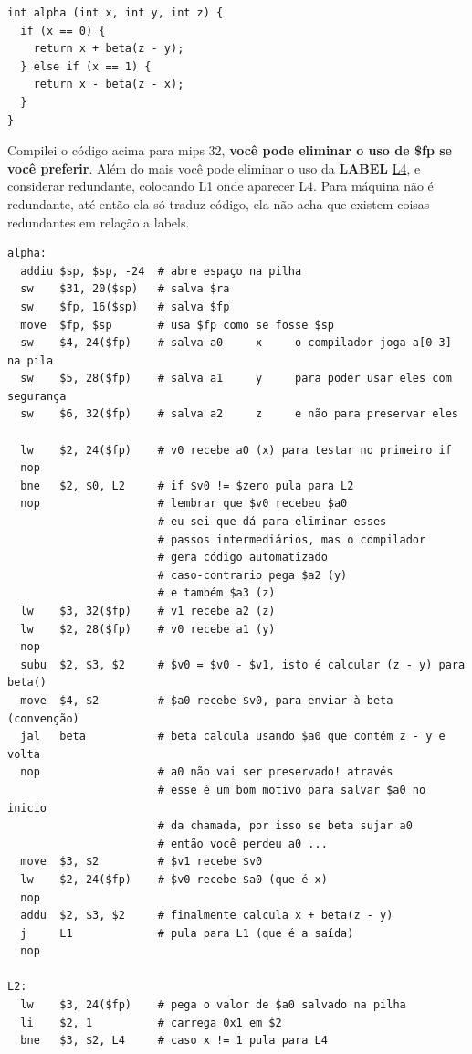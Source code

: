 \documentclass{article}
\begin{document}
\clearpage

\begin{verbatim}
int alpha (int x, int y, int z) {
  if (x == 0) {
    return x + beta(z - y);
  } else if (x == 1) {
    return x - beta(z - x);
  }
}
\end{verbatim}

Compilei o código acima para mips 32, {\bfseries você pode eliminar o uso de
\$fp se você preferir}. Além do mais você pode eliminar o uso da \textbf{LABEL}
\underline{L4}, e considerar redundante, colocando L1 onde aparecer L4. Para
máquina não é redundante, até então ela só traduz código, ela não acha que
existem coisas redundantes em relação a labels.

\begin{verbatim}
alpha:
  addiu $sp, $sp, -24  # abre espaço na pilha
  sw    $31, 20($sp)   # salva $ra
  sw    $fp, 16($sp)   # salva $fp
  move  $fp, $sp       # usa $fp como se fosse $sp
  sw    $4, 24($fp)    # salva a0     x     o compilador joga a[0-3] na pila
  sw    $5, 28($fp)    # salva a1     y     para poder usar eles com segurança
  sw    $6, 32($fp)    # salva a2     z     e não para preservar eles

  lw    $2, 24($fp)    # v0 recebe a0 (x) para testar no primeiro if
  nop
  bne   $2, $0, L2     # if $v0 != $zero pula para L2
  nop                  # lembrar que $v0 recebeu $a0
                       # eu sei que dá para eliminar esses
                       # passos intermediários, mas o compilador
                       # gera código automatizado
                       # caso-contrario pega $a2 (y)
                       # e também $a3 (z)
  lw    $3, 32($fp)    # v1 recebe a2 (z)
  lw    $2, 28($fp)    # v0 recebe a1 (y)
  nop
  subu  $2, $3, $2     # $v0 = $v0 - $v1, isto é calcular (z - y) para beta()
  move  $4, $2         # $a0 recebe $v0, para enviar à beta (convenção)
  jal   beta           # beta calcula usando $a0 que contém z - y e volta
  nop                  # a0 não vai ser preservado! através
                       # esse é um bom motivo para salvar $a0 no inicio
                       # da chamada, por isso se beta sujar a0
                       # então você perdeu a0 ...
  move  $3, $2         # $v1 recebe $v0
  lw    $2, 24($fp)    # $v0 recebe $a0 (que é x)
  nop
  addu  $2, $3, $2     # finalmente calcula x + beta(z - y)
  j     L1             # pula para L1 (que é a saída)
  nop

L2:
  lw    $3, 24($fp)    # pega o valor de $a0 salvado na pilha
  li    $2, 1          # carrega 0x1 em $2
  bne   $3, $2, L4     # caso x != 1 pula para L4


\end{verbatim}
\end{document}
